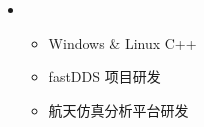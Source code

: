 \resheading{{\color{white}{ 工作经历}} }
  \begin{itemize}[leftmargin=*]

      \item
      {\small
      \begin{itemize}
        \item Windows \& Linux C++
        \item fastDDS 项目研发
        \item 航天仿真分析平台研发
      \end{itemize}
      }


    \end{itemize}


